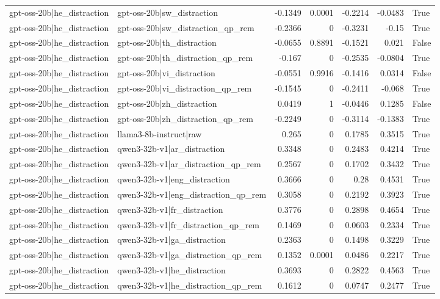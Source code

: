 \begin{table}
\begin{tabular}{l l r r r r l}
gpt-oss-20b|he_distraction & gpt-oss-20b|sw_distraction & -0.1349 & 0.0001 & -0.2214 & -0.0483 & True \\
gpt-oss-20b|he_distraction & gpt-oss-20b|sw_distraction_qp_rem & -0.2366 & 0 & -0.3231 & -0.15 & True \\
gpt-oss-20b|he_distraction & gpt-oss-20b|th_distraction & -0.0655 & 0.8891 & -0.1521 & 0.021 & False \\
gpt-oss-20b|he_distraction & gpt-oss-20b|th_distraction_qp_rem & -0.167 & 0 & -0.2535 & -0.0804 & True \\
gpt-oss-20b|he_distraction & gpt-oss-20b|vi_distraction & -0.0551 & 0.9916 & -0.1416 & 0.0314 & False \\
gpt-oss-20b|he_distraction & gpt-oss-20b|vi_distraction_qp_rem & -0.1545 & 0 & -0.2411 & -0.068 & True \\
gpt-oss-20b|he_distraction & gpt-oss-20b|zh_distraction & 0.0419 & 1 & -0.0446 & 0.1285 & False \\
gpt-oss-20b|he_distraction & gpt-oss-20b|zh_distraction_qp_rem & -0.2249 & 0 & -0.3114 & -0.1383 & True \\
gpt-oss-20b|he_distraction & llama3-8b-instruct|raw & 0.265 & 0 & 0.1785 & 0.3515 & True \\
gpt-oss-20b|he_distraction & qwen3-32b-v1|ar_distraction & 0.3348 & 0 & 0.2483 & 0.4214 & True \\
gpt-oss-20b|he_distraction & qwen3-32b-v1|ar_distraction_qp_rem & 0.2567 & 0 & 0.1702 & 0.3432 & True \\
gpt-oss-20b|he_distraction & qwen3-32b-v1|eng_distraction & 0.3666 & 0 & 0.28 & 0.4531 & True \\
gpt-oss-20b|he_distraction & qwen3-32b-v1|eng_distraction_qp_rem & 0.3058 & 0 & 0.2192 & 0.3923 & True \\
gpt-oss-20b|he_distraction & qwen3-32b-v1|fr_distraction & 0.3776 & 0 & 0.2898 & 0.4654 & True \\
gpt-oss-20b|he_distraction & qwen3-32b-v1|fr_distraction_qp_rem & 0.1469 & 0 & 0.0603 & 0.2334 & True \\
gpt-oss-20b|he_distraction & qwen3-32b-v1|ga_distraction & 0.2363 & 0 & 0.1498 & 0.3229 & True \\
gpt-oss-20b|he_distraction & qwen3-32b-v1|ga_distraction_qp_rem & 0.1352 & 0.0001 & 0.0486 & 0.2217 & True \\
gpt-oss-20b|he_distraction & qwen3-32b-v1|he_distraction & 0.3693 & 0 & 0.2822 & 0.4563 & True \\
gpt-oss-20b|he_distraction & qwen3-32b-v1|he_distraction_qp_rem & 0.1612 & 0 & 0.0747 & 0.2477 & True \\

\end{tabular}
\end{table}

